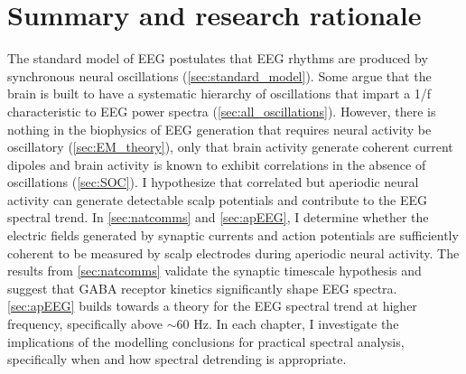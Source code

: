 \section{Summary and research rationale}
The standard model of EEG postulates that EEG rhythms are produced by synchronous neural oscillations (\autoref{sec:standard_model}). Some argue that the brain is built to have a systematic hierarchy of oscillations that impart a 1/f characteristic to EEG power spectra (\autoref{sec:all_oscillations}). However, there is nothing in the biophysics of EEG generation that requires neural activity be oscillatory (\autoref{sec:EM_theory}), only that brain activity generate coherent current dipoles and brain activity is known to exhibit correlations in the absence of oscillations (\autoref{sec:SOC}). I hypothesize that correlated but aperiodic neural activity can generate detectable scalp potentials and contribute to the EEG spectral trend. In \autoref{sec:natcomms} and \autoref{sec:apEEG}, I determine whether the electric fields generated by synaptic currents and action potentials are sufficiently coherent to be measured by scalp electrodes during aperiodic neural activity. The results from \autoref{sec:natcomms} validate the synaptic timescale hypothesis and suggest that GABA receptor kinetics significantly shape EEG spectra. \autoref{sec:apEEG} builds towards a theory for the EEG spectral trend at higher frequency, specifically above $\sim60$ \unit{\hertz}. In each chapter, I investigate the implications of the modelling conclusions for practical spectral analysis, specifically when and how spectral detrending is appropriate.
